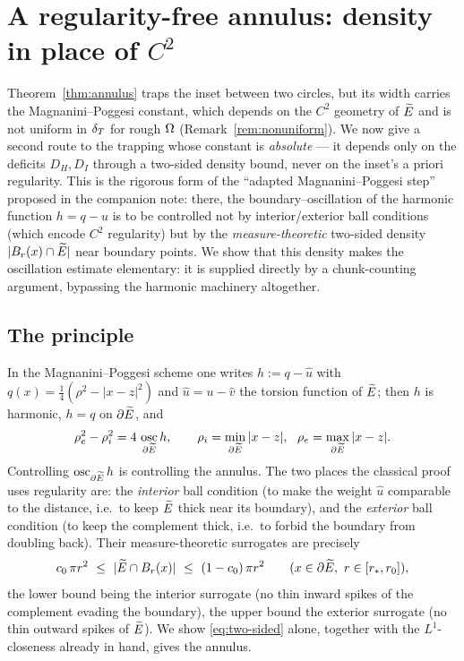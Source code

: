\section{A regularity-free annulus: density in place of $C^2$}
\label{sec:density}

Theorem~\ref{thm:annulus} traps the inset between two circles, but its
width carries the Magnanini--Poggesi constant, which depends on the $C^2$
geometry of $\widetilde E$ and is not uniform in $\delta_T$ for rough $\Omega$
(Remark~\ref{rem:nonuniform}). We now give a second route to the trapping
whose constant is \emph{absolute} --- it depends only on the deficits
$D_H,D_I$ through a two-sided density bound, never on the inset's a priori
regularity. This is the rigorous form of the ``adapted Magnanini--Poggesi
step'' proposed in the companion note: there, the boundary--oscillation of
the harmonic function $h=q-u$ is to be controlled not by interior/exterior
ball conditions (which encode $C^2$ regularity) but by the
\emph{measure-theoretic} two-sided density $|B_r(x)\cap\widetilde E|$ near boundary
points. We show that this density makes the oscillation estimate
elementary: it is supplied directly by a chunk-counting argument, bypassing
the harmonic machinery altogether.

\subsection{The principle}

In the Magnanini--Poggesi scheme one writes $h:=q-\hat u$ with
$q(x)=\tfrac14(\rho^2-|x-z|^2)$ and $\hat u=u-\hat v$ the torsion function
of $\widetilde E$; then $h$ is harmonic, $h=q$ on $\partial\widetilde E$, and
\begin{equation}\label{eq:osc}
   \rho_e^2-\rho_i^2=4\,\operatorname*{osc}_{\partial\Etil}h,
   \qquad
   \rho_i=\min_{\partial\Etil}|x-z|,\ \ \rho_e=\max_{\partial\Etil}|x-z|.
\end{equation}
Controlling $\operatorname{osc}_{\partial\widetilde E}h$ is controlling the
annulus. The two places the classical proof uses regularity are: the
\emph{interior} ball condition (to make the weight $\hat u$ comparable to
the distance, i.e.\ to keep $\widetilde E$ thick near its boundary), and the
\emph{exterior} ball condition (to keep the complement thick, i.e.\ to
forbid the boundary from doubling back). Their measure-theoretic
surrogates are precisely
\begin{equation}\label{eq:two-sided}
   c_0\,\pi r^2\ \le\ |\widetilde E\cap B_r(x)|\ \le\ (1-c_0)\,\pi r^2
   \qquad(x\in\partial\widetilde E,\ r\in[r_*,r_0]),
\end{equation}
the lower bound being the interior surrogate (no thin inward spikes of the
complement evading the boundary), the upper bound the exterior surrogate
(no thin outward spikes of $\widetilde E$). We show \eqref{eq:two-sided} alone,
together with the $L^1$-closeness already in hand, gives the annulus.

